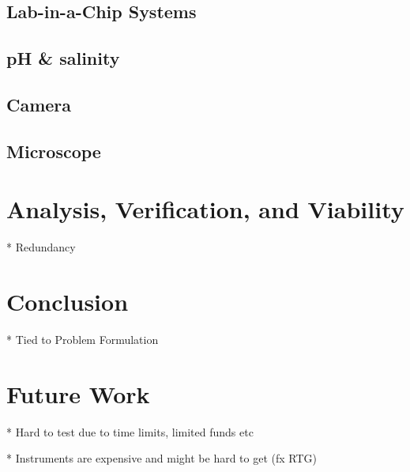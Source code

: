 \documentclass{book}
\begin{document}
\subsection{Lab-in-a-Chip Systems}


\subsection{pH \& salinity}

\subsection{Camera}

\subsection{Microscope}

\section{Analysis, Verification, and Viability}

* Redundancy

\section{Conclusion}

* Tied to Problem Formulation

\section{Future Work}

* Hard to test due to time limits, limited funds etc

    * Instruments are expensive and might be hard to get (fx RTG)


\end{document}
